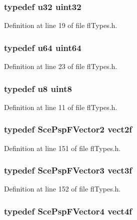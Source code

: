 \subsubsection{\setlength{\rightskip}{0pt plus 5cm}typedef u32 {\bf uint32}}\label{flTypes_8h_13bdb6ec18cd62b254a4635c9873ef5d}




Definition at line 19 of file fl\-Types.h.
\subsubsection{\setlength{\rightskip}{0pt plus 5cm}typedef u64 {\bf uint64}}\label{flTypes_8h_080c27aa89210a5bd4ed59bcdef18996}




Definition at line 23 of file fl\-Types.h.
\subsubsection{\setlength{\rightskip}{0pt plus 5cm}typedef u8 {\bf uint8}}\label{flTypes_8h_30aeb5ca91db64dfc0e591cafba4abe2}




Definition at line 11 of file fl\-Types.h.
\subsubsection{\setlength{\rightskip}{0pt plus 5cm}typedef Sce\-Psp\-FVector2 {\bf vect2f}}\label{flTypes_8h_aa82c9fe8f73d95dd2c04111f6c4df04}




Definition at line 151 of file fl\-Types.h.
\subsubsection{\setlength{\rightskip}{0pt plus 5cm}typedef Sce\-Psp\-FVector3 {\bf vect3f}}\label{flTypes_8h_3a47c621e6f02f2c15ee0f9ac6a4c9a1}




Definition at line 152 of file fl\-Types.h.
\subsubsection{\setlength{\rightskip}{0pt plus 5cm}typedef Sce\-Psp\-FVector4 {\bf vect4f}}\label{flTypes_8h_0a7e4dee7a86fb93c0c120722f1151eb}




